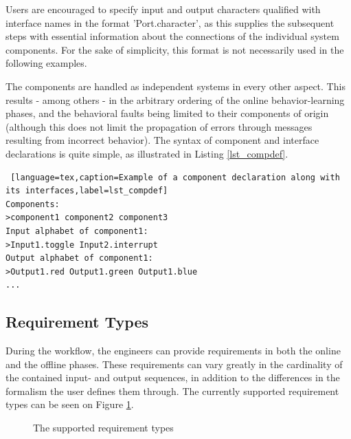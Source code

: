 Users are encouraged to specify input and output characters qualified with interface names in the format 'Port.character', as this supplies the subsequent steps with essential information about the connections of the individual system components. For the sake of simplicity, this format is not necessarily used in the following examples.

The components are handled as independent systems in every other aspect. This results - among others - in the arbitrary ordering of the online behavior-learning phases, and the behavioral faults being limited to their components of origin (although this does not limit the propagation of errors through messages resulting from incorrect behavior).
The syntax of component and interface declarations is quite simple, as illustrated in Listing \ref{lst_compdef}.

\bigskip
\begin{lstlisting} [language=tex,caption=Example of a component declaration along with its interfaces,label=lst_compdef]
Components:
>component1 component2 component3
Input alphabet of component1:
>Input1.toggle Input2.interrupt
Output alphabet of component1: 
>Output1.red Output1.green Output1.blue
...
\end{lstlisting}

\subsection{Requirement Types} \label{subs_reqtypes}
During the workflow, the engineers can provide requirements in both the online and the offline phases. These requirements can vary greatly in the cardinality of the contained input- and output sequences, in addition to the differences in the formalism the user defines them through. The currently supported requirement types can be seen on Figure \ref{fig_requirementtypes}.

\begin{figure}[!ht] 
	\centering
	\caption{The supported requirement types}
	\label{fig_requirementtypes}
\end{figure}

